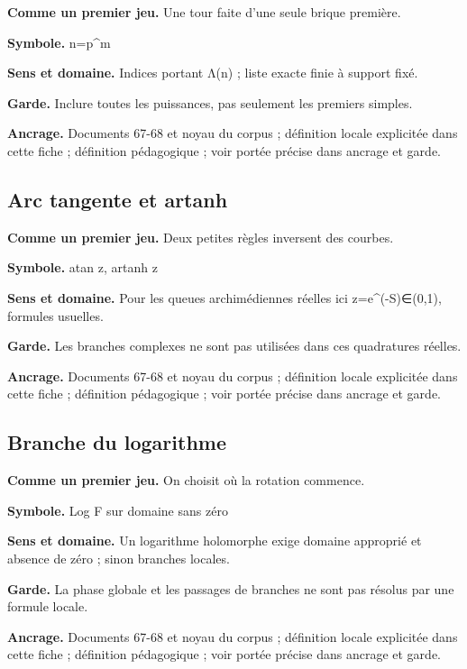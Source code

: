 \documentclass[
  9pt,
  a4paper,
]{article}
\begin{document}
\textbf{Comme un premier jeu.} Une tour faite d'une seule brique
première.

\textbf{Symbole.} n=p\^{}m

\textbf{Sens et domaine.} Indices portant Λ(n) ; liste exacte finie à
support fixé.

\textbf{Garde.} Inclure toutes les puissances, pas seulement les
premiers simples.

\textbf{Ancrage.} Documents 67-68 et noyau du corpus ; définition locale
explicitée dans cette fiche ; définition pédagogique ; voir portée
précise dans ancrage et garde.

\hypertarget{arc-tangente-et-artanh}{%
\subsection{Arc tangente et artanh}\label{arc-tangente-et-artanh}}

\textbf{Comme un premier jeu.} Deux petites règles inversent des
courbes.

\textbf{Symbole.} atan z, artanh z

\textbf{Sens et domaine.} Pour les queues archimédiennes réelles ici
z=e\^{}(-S)∈(0,1), formules usuelles.

\textbf{Garde.} Les branches complexes ne sont pas utilisées dans ces
quadratures réelles.

\textbf{Ancrage.} Documents 67-68 et noyau du corpus ; définition locale
explicitée dans cette fiche ; définition pédagogique ; voir portée
précise dans ancrage et garde.

\hypertarget{branche-du-logarithme}{%
\subsection{Branche du logarithme}\label{branche-du-logarithme}}

\textbf{Comme un premier jeu.} On choisit où la rotation commence.

\textbf{Symbole.} Log F sur domaine sans zéro

\textbf{Sens et domaine.} Un logarithme holomorphe exige domaine
approprié et absence de zéro ; sinon branches locales.

\textbf{Garde.} La phase globale et les passages de branches ne sont pas
résolus par une formule locale.

\textbf{Ancrage.} Documents 67-68 et noyau du corpus ; définition locale
explicitée dans cette fiche ; définition pédagogique ; voir portée
précise dans ancrage et garde.
\end{document}
